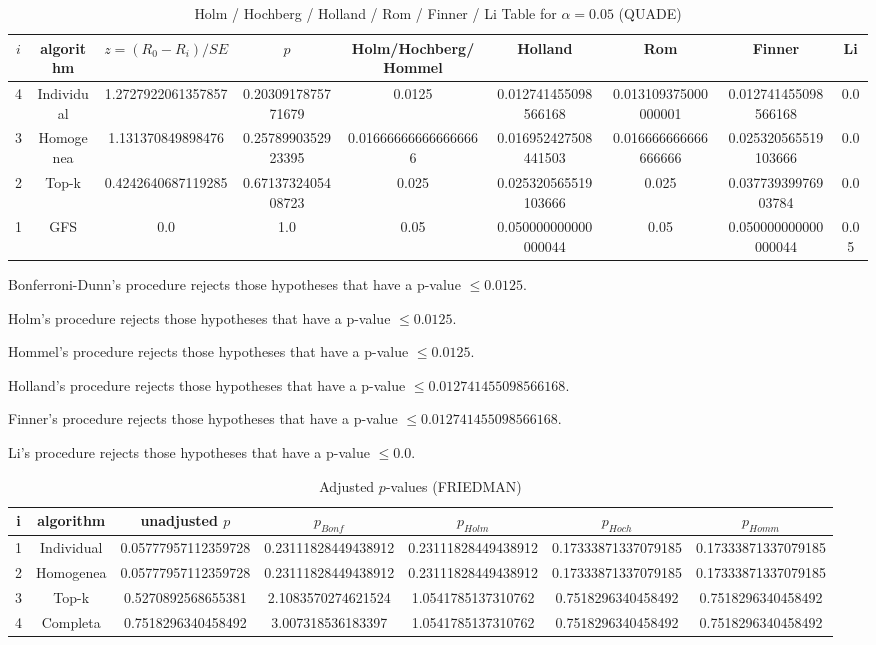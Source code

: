 \documentclass[a4paper,10pt]{article}
\begin{document}
\begin{landscape}
\newpage

\begin{table}[!htp]
\centering\scriptsize
\caption{Holm / Hochberg / Holland / Rom / Finner / Li Table for $\alpha=0.05$ (QUADE)}
\begin{tabular}{ccccccccc}
$i$&algorithm&$z=(R_0 - R_i)/SE$&$p$&Holm/Hochberg/Hommel&Holland&Rom&Finner&Li\\
\hline
4&Individual&1.2727922061357857&0.2030917875771679&0.0125&0.012741455098566168&0.013109375000000001&0.012741455098566168&0.0\\
3&Homogenea&1.131370849898476&0.2578990352923395&0.016666666666666666&0.016952427508441503&0.016666666666666666&0.025320565519103666&0.0\\
2&Top-k&0.4242640687119285&0.6713732405408723&0.025&0.025320565519103666&0.025&0.03773939976903784&0.0\\
1&GFS&0.0&1.0&0.05&0.050000000000000044&0.05&0.050000000000000044&0.05\\
\hline
\end{tabular}
\end{table}
Bonferroni-Dunn's procedure rejects those hypotheses that have a p-value $\le0.0125$.


Holm's procedure rejects those hypotheses that have a p-value $\le0.0125$.


Hommel's procedure rejects those hypotheses that have a p-value $\le0.0125$.


Holland's procedure rejects those hypotheses that have a p-value $\le0.012741455098566168$.


Finner's procedure rejects those hypotheses that have a p-value $\le0.012741455098566168$.


Li's procedure rejects those hypotheses that have a p-value $\le0.0$.



\newpage

\begin{table}[!htp]
\centering\scriptsize
\caption{Adjusted $p$-values (FRIEDMAN)}
\begin{tabular}{ccccccc}
i&algorithm&unadjusted $p$&$p_{Bonf}$&$p_{Holm}$&$p_{Hoch}$&$p_{Homm}$\\
\hline
1&Individual&0.05777957112359728&0.23111828449438912&0.23111828449438912&0.17333871337079185&0.17333871337079185\\
2&Homogenea&0.05777957112359728&0.23111828449438912&0.23111828449438912&0.17333871337079185&0.17333871337079185\\
3&Top-k&0.5270892568655381&2.1083570274621524&1.0541785137310762&0.7518296340458492&0.7518296340458492\\
4&Completa&0.7518296340458492&3.007318536183397&1.0541785137310762&0.7518296340458492&0.7518296340458492\\
\hline
\end{tabular}
\end{table}


\end{landscape}
\end{document}
